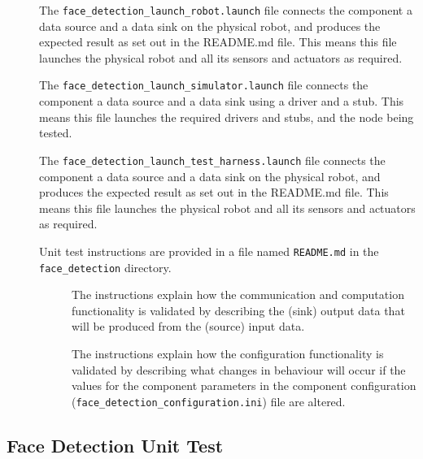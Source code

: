 \documentclass{CSSRforAfrica}
\newcommand{\checkboxChecked}{\fbox{\ding{51}}} %
\newcommand{\checkboxDashed}{\fbox{--}}         %
\begin{document}
\begin{description}
\item[\checkboxDashed] The {\small \verb+face_detection_launch_robot.launch+} file connects the component a data source and a data sink on the physical robot, and produces the expected result as set out in the README.md file. This means this file launches the physical robot and all its sensors and actuators as required.

\item[\checkboxDashed]   The {\small \verb+face_detection_launch_simulator.launch+} file connects the component a data source and a data sink using a driver and a stub. This means this file launches the required drivers and stubs, and the node being tested.

\item[\checkboxDashed]   The {\small \verb+face_detection_launch_test_harness.launch+} file connects the component a data source and a data sink on the physical robot, and produces the expected result as set out in the README.md file. This means this file launches the physical robot and all its sensors and actuators as required.

\item[\checkboxChecked] Unit test instructions are provided in a file named {\small \verb+README.md+} in the  {\small \verb+face_detection+} directory. 


\begin{description}

\item[\checkboxChecked] The instructions explain how the communication and computation functionality is validated by describing the (sink) output data that will be produced from the (source) input data.  

\item[\checkboxChecked] The instructions explain how the configuration functionality is validated by describing what changes in behaviour will occur if the values for the component parameters in the component configuration ({\small \verb+face_detection_configuration.ini+}) file are altered.

\end{description}

\end{description} 

 
 
\subsection{Face Detection Unit Test} 
\label{subsection:face_detetction_test}
\end{document}
